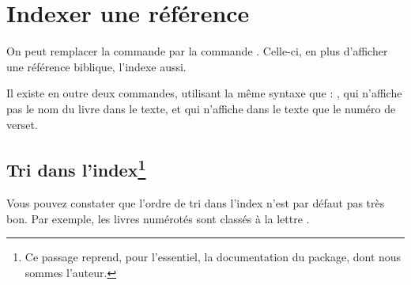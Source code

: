 \section{Indexer une référence}

On peut remplacer la commande  par la commande . Celle-ci, en plus d'afficher une référence biblique, l'indexe aussi.

Il existe en outre deux commandes, utilisant la même syntaxe que  : , qui n'affiche pas le nom du livre dans le texte, et  qui n'affiche dans le texte que le numéro de verset.

\subsection[Tri dans l'index]{Tri dans l'index\footnote{Ce passage reprend, pour l'essentiel, la documentation du package, dont nous sommes l'auteur.}}

Vous pouvez constater que l'ordre de tri dans l'index n'est par défaut pas très bon. Par exemple, les livres numérotés sont classés à la lettre . 

